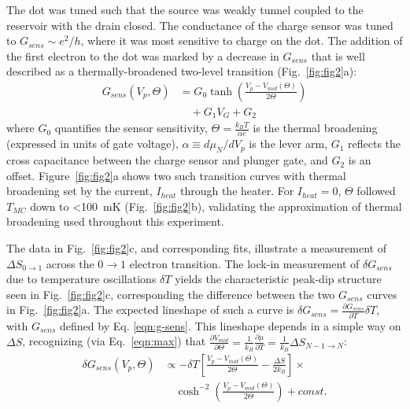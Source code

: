 \documentclass[twocolumn,showpacs,amsmath,amssymb,prl,aps,superscriptaddress]{revtex4-1}
\begin{document}
The dot was tuned such that the source was weakly tunnel coupled to the reservoir with the drain closed.  The conductance of the charge sensor was tuned to $G_{sens}{\sim}e^2/h$, where it was most sensitive to charge on the dot.  The addition of the first electron to the dot was marked by a decrease in $G_{sens}$ that is well described as a thermally-broadened two-level transition (Fig.~\ref{fig:fig2}a):
%
\begin{align}
\label{eqn:g-sens}
        G_{sens}(V_p,\Theta) &= G_0 \tanh\left(\frac{V_p - V_{mid}(\Theta)}{2\Theta}\right)  \\
                        &\quad + G_1 V_{G} + G_2 \nonumber
\end{align}
%
where $G_0$ quantifies the sensor sensitivity, $\Theta = \frac{k_B T}{\alpha e}$ is the thermal broadening (expressed in units of gate voltage), $\alpha\equiv d \mu_{N}/d V_p$ is the lever arm,  $G_1$ reflects the cross capacitance between the charge sensor and plunger gate, and $G_2$ is an offset. Figure~\ref{fig:fig2}a shows two such transition curves with thermal broadening set by the current, $I_{heat}$ through the heater. For $I_{heat}=0$, $\Theta$ followed $T_{MC}$ down to \SI{<100}{\milli\kelvin} (Fig.~\ref{fig:fig2}b), validating the approximation of thermal broadening used throughout this experiment.

The data in Fig.~\ref{fig:fig2}c, and corresponding fits, illustrate a measurement of $\Delta S_{0\rightarrow 1}$ across the $0 \rightarrow 1$ electron transition. The lock-in measurement of $\delta G_{sens}$ due to temperature oscillations $\delta T$ yields the characteristic peak-dip structure seen in Fig.~\ref{fig:fig2}c, corresponding the difference between the two $G_{sens}$ curves in Fig.~\ref{fig:fig2}a. The expected lineshape of such a curve is $\delta G_{sens} = \frac{\partial G_{sens}}{\partial T} \delta T$, with $G_{sens}$ defined by Eq. \ref{eqn:g-sens}.  This lineshape depends in a simple way on $\Delta S$, recognizing (via Eq.~\ref{eqn:max}) that $\frac{\partial V_{mid}}{\partial \Theta}=\frac{1}{k_B}\frac{\partial \mu}{\partial T} =\frac{1}{k_B}\Delta S_{N-1\rightarrow N}$:
%
\begin{align}
\label{eqn:dg-sens}
        \delta G_{sens}(V_p, \Theta) &\propto -\delta T \left[ \frac{V_p - V_{mid}(\Theta)}{2\Theta} - \frac{\Delta S}{2k_B} \right]\times \\
        				      &\quad\cosh^{-2}\left(\frac{V_p - V_{mid}(\Theta)}{2\Theta}\right) + const. \nonumber
\end{align}
%
\end{document}
